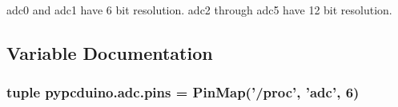 adc0 and adc1 have 6 bit resolution. adc2 through adc5 have 12 bit resolution. 

\subsection{Variable Documentation}
\hypertarget{namespacepypcduino_1_1adc_a766105e33e35d9fa020e87c19e6ddf07}{
\subsubsection[{pins}]{\setlength{\rightskip}{0pt plus 5cm}tuple pypcduino.\-adc.\-pins = Pin\-Map('/proc', 'adc', 6)}}\label{namespacepypcduino_1_1adc_a766105e33e35d9fa020e87c19e6ddf07}
